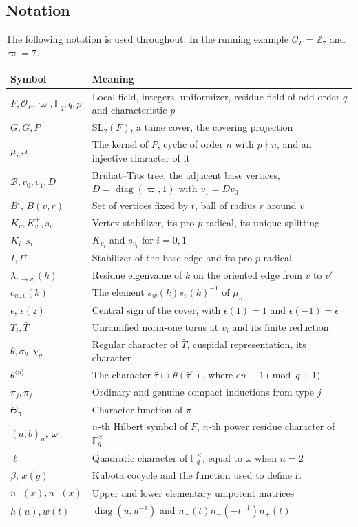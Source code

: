 \documentclass[12pt,letterpaper]{article}
\numberwithin{equation}{section}
\theoremstyle{definition}
\theoremstyle{remark}
\newcommand{\OO}{\mathcal O_F}
\newcommand{\kk}{\mathbb F_q}
\newcommand{\Gt}{\widetilde G}
\newcommand{\diag}{\operatorname{diag}}
\newcommand{\BT}{\mathscr B}
\newcommand{\np}{n_{+}}
\newcommand{\nm}{n_{-}}
\newcommand{\sgn}{\epsilon}
\begin{document}
\subsection*{Notation}
The following notation is used throughout. In the running example $\OO=\mathbb Z_7$ and $\varpi=7$.
\begin{center}
\small
\begin{tabular}{@{}lp{}@{}}
\toprule
Symbol & Meaning\\ \midrule
$F,\OO,\varpi,\kk,q,p$ & Local field, integers, uniformizer, residue field of odd order $q$ and characteristic $p$\\
$G,\Gt,P$ & $\mathrm{SL}_2(F)$, a tame cover, the covering projection\\
$\mu_n,\iota$ & The kernel of $P$, cyclic of order $n$ with $p\nmid n$, and an injective character of it\\
$\BT,v_0,v_1,D$ & Bruhat--Tits tree, the adjacent base vertices, $D=\diag(\varpi,1)$ with $v_1=Dv_0$\\
$B^t$, $B(v,r)$ & Set of vertices fixed by $t$, ball of radius $r$ around $v$\\
$K_v,K_v^+,s_v$ & Vertex stabilizer, its pro-$p$ radical, its unique splitting\\
$K_i,s_i$ & $K_{v_i}$ and $s_{v_i}$ for $i=0,1$\\
$I,I^+$ & Stabilizer of the base edge and its pro-$p$ radical\\
$\lambda_{v\to v'}(k)$ & Residue eigenvalue of $k$ on the oriented edge from $v$ to $v'$\\
$c_{w,v}(k)$ & The element $s_w(k)s_v(k)^{-1}$ of $\mu_n$\\
$\sgn$, $\sgn(z)$ & Central sign of the cover, with $\sgn(1)=1$ and $\sgn(-1)=\sgn$\\
$T_i,\bar T$ & Unramified norm-one torus at $v_i$ and its finite reduction\\
$\theta,\sigma_\theta,\chi_\theta$ & Regular character of $\bar T$, cuspidal representation, its character\\
$\theta^{\langle n\rangle}$ & The character $\bar\tau\mapsto\theta(\bar\tau^{e})$, where $en\equiv1\pmod{q+1}$\\
$\pi_j,\widetilde\pi_j$ & Ordinary and genuine compact inductions from type $j$\\
$\Theta_\pi$ & Character function of $\pi$\\
$(a,b)_n,\ \omega$ & $n$-th Hilbert symbol of $F$, $n$-th power residue character of $\kk^\times$\\
$\ell$ & Quadratic character of $\kk^\times$, equal to $\omega$ when $n=2$\\
$\beta$, $x(g)$ & Kubota cocycle and the function used to define it\\
$\np(x),\nm(x)$ & Upper and lower elementary unipotent matrices\\
$h(u),w(t)$ & $\diag(u,u^{-1})$ and $\np(t)\nm(-t^{-1})\np(t)$\\
\bottomrule
\end{tabular}
\end{center}
\end{document}

